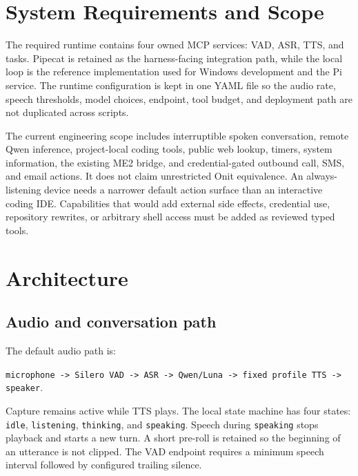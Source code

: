 \documentclass[sigconf,nonacm]{acmart}
\begin{document}
\section{System Requirements and Scope}

The required runtime contains four owned MCP services: VAD, ASR, TTS, and
tasks. Pipecat is retained as the harness-facing integration path, while the
local loop is the reference implementation used for Windows development and
the Pi service. The runtime configuration is kept in one YAML file so the
audio rate, speech thresholds, model choices, endpoint, tool budget, and
deployment path are not duplicated across scripts.

The current engineering scope includes interruptible spoken conversation,
remote Qwen inference, project-local coding tools, public web lookup, timers,
system information, the existing ME2 bridge, and credential-gated outbound
call, SMS, and email actions. It does not claim unrestricted
Onit equivalence. An always-listening device needs a narrower default action
surface than an interactive coding IDE. Capabilities that would add external
side effects, credential use, repository rewrites, or arbitrary shell access
must be added as reviewed typed tools.

\section{Architecture}

\subsection{Audio and conversation path}

The default audio path is:
\begin{center}
\texttt{microphone -> Silero VAD -> ASR -> Qwen/Luna -> fixed profile TTS -> speaker}.
\end{center}
Capture remains active while TTS plays. The local state machine has four states:
\texttt{idle}, \texttt{listening}, \texttt{thinking}, and \texttt{speaking}.
Speech during \texttt{speaking} stops playback and starts a new turn. A short
pre-roll is retained so the beginning of an utterance is not clipped. The VAD
endpoint requires a minimum speech interval followed by configured trailing
silence.
\end{document}
